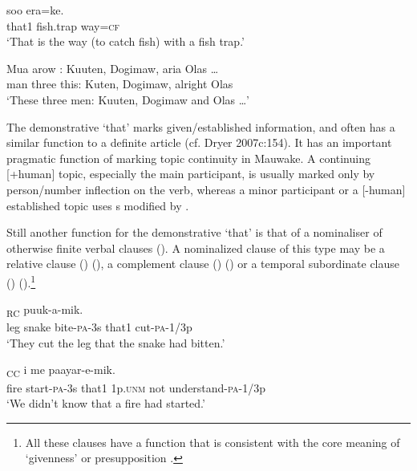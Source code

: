 \ea%
\label{ex:x639}
\gll {} soo era=ke. \\
that1 fish.trap way=\textsc{cf}\\
\glt`That is the way (to catch fish) with a fish trap.'
\z

\ea%
\label{ex:x640}
\gll Mua arow : Kuuten, Dogimaw, aria Olas {\dots} \\
man three this: Kuten, Dogimaw, alright Olas\\
\glt`These three men: Kuuten, Dogimaw and Olas {\dots}'
\z

The demonstrative  `that' marks given/established information, and often has a similar function to a definite article (cf. Dryer 2007c:154). It has an important pragmatic function of marking topic continuity in Mauwake. A continuing [+human] topic, especially the main participant, is usually marked only by person/number inflection on the verb, whereas a minor participant or a [-human] established topic uses s modified by .

Still another function for the demonstrative  `that' is that of a nominaliser of otherwise finite verbal clauses (). A nominalized clause of this type may be a relative clause () (), a complement clause () () or a temporal subordinate clause () ().\footnote{All these clauses have a function that is consistent with the core meaning of `givenness' \citep{Haiman1978} or presupposition \citep{Reesink1987}.}

\ea%
\label{ex:x687}
\textsubscript{RC} puuk-a-mik. \\
leg snake bite-\textsc{pa}-3s that1 cut-\textsc{pa}-1/3p\\
\glt`They cut the leg that the snake had bitten.'
\z

\ea%
\label{ex:x689}
\textsubscript{CC} i me paayar-e-mik. \\
fire start-\textsc{pa}-3s that1 1p.\textsc{unm} not understand-\textsc{pa}-1/3p\\
\glt`We didn't know that a fire had started.'
\z

